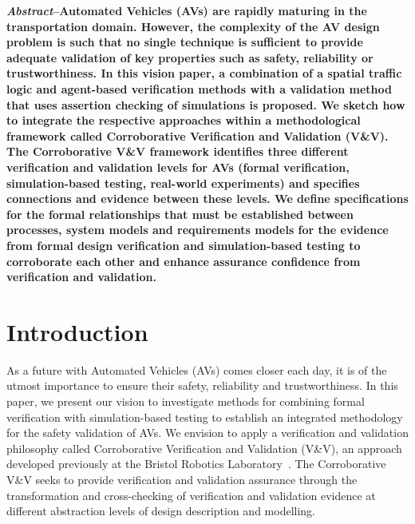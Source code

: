 \documentclass[runningheads,twocolumn,a4paper,10pt]{llncs}
\newcommand{\pathToSourceFiles}{source}
\begin{document}
\textbf{\textit{Abstract}--Automated Vehicles (AVs) are rapidly maturing in the transportation domain. However, the complexity of the AV design problem is such that no single technique is sufficient to provide adequate validation of key properties such as safety, reliability or trustworthiness. 
In this vision paper, a combination of a spatial traffic logic and agent-based verification methods with a validation method that uses assertion checking of simulations is proposed.
We sketch how to integrate the respective approaches within a methodological framework called Corroborative Verification and Validation (V\&V).
The Corroborative V\&V framework identifies three different verification and validation levels for AVs (formal verification, simulation-based testing, real-world experiments) and specifies connections and evidence between these levels. We define specifications for the formal relationships that must be established between processes, system models and requirements models for the evidence from formal design verification and simulation-based testing to corroborate each other and enhance assurance confidence from verification and validation.}


% 
\section{Introduction}
As a future with Automated Vehicles (AVs) comes closer each day, it is of the utmost importance to ensure their safety, reliability and trustworthiness. In this paper, we present our vision to investigate methods for combining formal verification with simulation-based testing to establish an integrated methodology for the safety validation of AVs.
We envision to apply a verification and validation philosophy called Corroborative Verification and Validation (V\&V), an approach developed previously at the Bristol Robotics Laboratory~\cite{corroborative-approach}. The Corroborative V\&V seeks to provide verification and validation assurance through the transformation and cross-checking of verification and validation evidence at different abstraction levels of design description and modelling.
\end{document}
